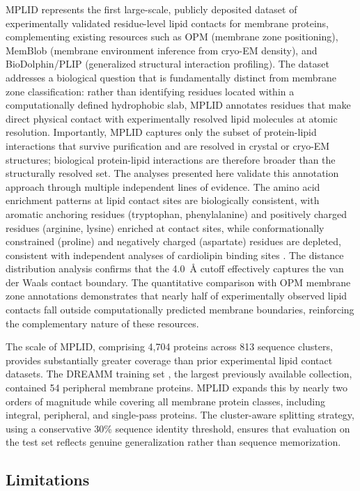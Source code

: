 \documentclass[unnumsec,webpdf,contemporary,large]{oup-authoring-template}
\begin{document}
MPLID represents the first large-scale, publicly deposited dataset of experimentally validated residue-level lipid contacts for membrane proteins, complementing existing resources such as OPM (membrane zone positioning), MemBlob (membrane environment inference from cryo-EM density), and BioDolphin/PLIP (generalized structural interaction profiling). The dataset addresses a biological question that is fundamentally distinct from membrane zone classification: rather than identifying residues located within a computationally defined hydrophobic slab, MPLID annotates residues that make direct physical contact with experimentally resolved lipid molecules at atomic resolution. Importantly, MPLID captures only the subset of protein-lipid interactions that survive purification and are resolved in crystal or cryo-EM structures; biological protein-lipid interactions are therefore broader than the structurally resolved set. The analyses presented here validate this annotation approach through multiple independent lines of evidence. The amino acid enrichment patterns at lipid contact sites are biologically consistent, with aromatic anchoring residues (tryptophan, phenylalanine) and positively charged residues (arginine, lysine) enriched at contact sites, while conformationally constrained (proline) and negatively charged (aspartate) residues are depleted, consistent with independent analyses of cardiolipin binding sites \cite{cdlbinding2021}. The distance distribution analysis confirms that the 4.0~\AA{} cutoff effectively captures the van der Waals contact boundary. The quantitative comparison with OPM membrane zone annotations demonstrates that nearly half of experimentally observed lipid contacts fall outside computationally predicted membrane boundaries, reinforcing the complementary nature of these resources.

The scale of MPLID, comprising 4,704 proteins across 813 sequence clusters, provides substantially greater coverage than prior experimental lipid contact datasets. The DREAMM training set \cite{chatzigoulas2022}, the largest previously available collection, contained 54 peripheral membrane proteins. MPLID expands this by nearly two orders of magnitude while covering all membrane protein classes, including integral, peripheral, and single-pass proteins. The cluster-aware splitting strategy, using a conservative 30\% sequence identity threshold, ensures that evaluation on the test set reflects genuine generalization rather than sequence memorization.

\subsection{Limitations}
\end{document}
